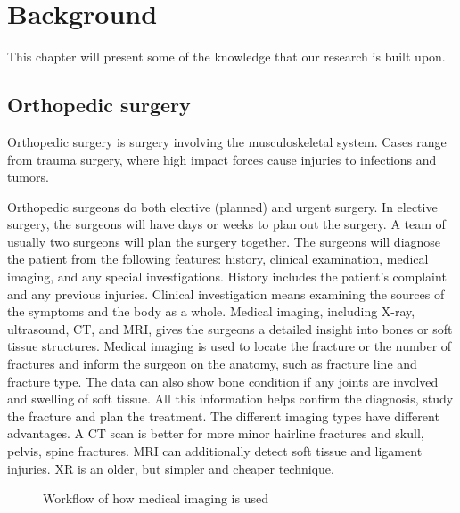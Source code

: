 \documentclass[a4paper]{report}
\begin{document}
\chapter{Background}\label{Background}
This chapter will present some of the knowledge that our research is built upon.

\section{Orthopedic surgery}

Orthopedic surgery is surgery involving the musculoskeletal system. Cases range from trauma surgery, where high impact forces cause injuries to infections and tumors\cite{swiontkowski_manual_2013}.

Orthopedic surgeons do both elective (planned) and urgent surgery. In elective surgery, the surgeons will have days or weeks to plan out the surgery. A team of usually two surgeons will plan the surgery together.
The surgeons will diagnose the patient from the following features: history, clinical examination, medical imaging, and any special investigations. History includes the patient's complaint and any previous injuries. Clinical investigation means examining the sources of the symptoms and the body as a whole. Medical imaging, including X-ray, ultrasound, CT, and MRI, gives the surgeons a detailed insight into bones or soft tissue structures\cite{swiontkowski_manual_2013}.
Medical imaging is used to locate the fracture or the number of fractures and inform the surgeon on the anatomy, such as fracture line and fracture type. 
The data can also show bone condition if any joints are involved and swelling of soft tissue. All this information helps confirm the diagnosis, study the fracture and plan the treatment\cite{ebnezar_textbook_2016}.
The different imaging types have different advantages. A CT scan is better for more minor hairline fractures and skull, pelvis, spine fractures. MRI can additionally detect soft tissue and ligament injuries. XR is an older, but simpler and cheaper technique\cite{ebnezar_textbook_2016}.

\begin{figure}[h!]
    \centering
	\hfill
  \caption{Workflow of how medical imaging is used}
  \small
\end{figure}
\end{document}
